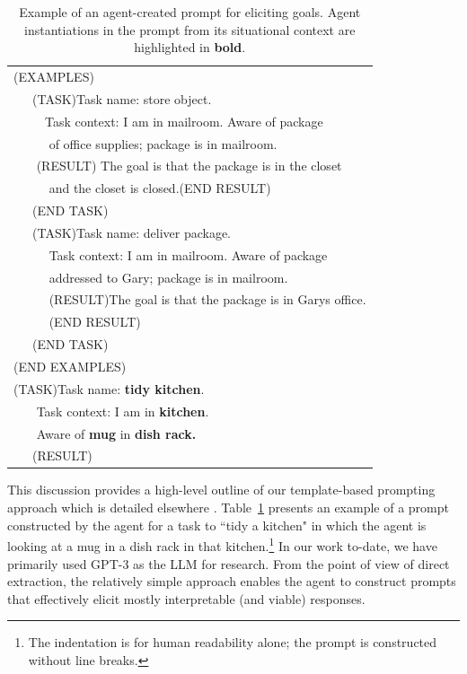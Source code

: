 \documentclass[letterpaper]{article} %
\begin{document}
\begin{table}[t]
\centering
\begin{tabular}{l}
\hline
(EXAMPLES)\\
~~~(TASK)Task name: store object. \\ ~~~~~Task context: I am in mailroom.
Aware of package  \\ ~~~~~ of office supplies; package is in mailroom.\\
~~~ (RESULT) The goal is that the package is in the closet \\
~~~~~ and the closet is closed.(END RESULT) \\
~~~(END TASK) \\
~~~(TASK)Task name: deliver package. \\ ~~~~~ Task context: I am in mailroom.
Aware of package \\ ~~~~~ addressed to Gary; package is in mailroom. \\
~~~~~ (RESULT)The goal is that the package is in Garys office. \\~~~~~ (END RESULT)
\\ ~~~(END TASK) \\
(END EXAMPLES) \\
(TASK)Task name: \textbf{tidy kitchen}. \\ ~~~ Task context: I am in \textbf{kitchen}. \\
~~~ Aware of \textbf{mug} in \textbf{dish rack.}\\ ~~~(RESULT) \\
\hline


\end{tabular}
\caption{Example of an agent-created prompt for eliciting goals. Agent instantiations in the prompt from its situational context are highlighted in \textbf{bold}.}
\label{tab:prompt_example}
\end{table}


This discussion provides a high-level outline of our template-based prompting approach which is detailed elsewhere \cite{kirk_improving_2022}. Table~\ref{tab:prompt_example} presents an example of a prompt constructed by the agent for a task to ``tidy a kitchen" in which the agent is looking at a mug in a dish rack in that kitchen.\footnote{The indentation is for human readability alone; the prompt is constructed without line breaks.} In our work to-date, we have primarily used GPT-3 \cite{brown_language_2020} as the LLM for research. From the point of view of direct extraction, the relatively simple approach enables the agent to construct prompts that effectively elicit mostly interpretable (and viable) responses.
\end{document}
